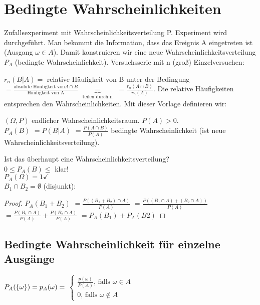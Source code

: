 \renewcommand{\ldate}{2015-11-16}

\section{Bedingte Wahrscheinlichkeiten}
Zufallsexperiment mit Wahrscheinlichkeitsverteilung P. Experiment wird durchgeführt. Man bekommt die Information, dass das Ereignis A eingetreten ist (Ausgang $\omega \in A$). Damit konstruieren wir eine neue Wahrscheinlichkeitsverteilung $P_A$ (bedingte Wahrscheinlichkeit). Versuchsserie mit n (groß) Einzelversuchen:
 
$ r_n(B|A) = $ relative Häufigkeit von B unter der Bedingung 
$= \frac{\textrm{absolute Häufigkeit von} A \cap B}{\textrm{Häufigkeit von A}}$
$\underbrace{=}_{\textrm{teilen durch n}}$
$=\frac{r_n(A\cap B)}{r_n(A)}$.
Die relative Häufigkeiten entsprechen den Wahrscheinlichkeiten. Mit dieser Vorlage definieren wir: 

\begin{defi}
$(\Omega,P)$ endlicher Wahrscheinlichkeitsraum. $P(A) > 0$. \\
$P_A(B) $
$=P(B|A)$  
$=\frac{P(A\cap B)}{P(A)}$
bedingte Wahrscheinlichkeit (ist neue Wahrscheinlichkeitsverteilung). 
\end{defi}

Ist das überhaupt eine Wahrscheinlichkeitsverteilung? \\
$0 \leq P_A(B) \leq$ klar!\\
$P_A(\Omega)=1 \checkmark$\\
$B_1 \cap B_2 = \emptyset$ (disjunkt): 
\begin{proof}
$P_A(B_1 + B_2)$
$=\frac{P((B_1+B_2) \cap A)}{P(A)}$
$=\frac{P((B_1\cap A)+ (B_2\cap A))}{P(A)}$
$=\frac{P(B_1\cap A)}{P(A)} + \frac{P(B_2\cap A)}{P(A)}$
$=P_A(B_1) + P_A(B2)$
\end{proof}

\subsection{Bedingte Wahrscheinlichkeit für einzelne Ausgänge}
$P_A( \left\lbrace \omega \right\rbrace ) = p_A(\omega) = $
$\begin{cases}
\frac{p(\omega)}{P(A)}\textrm{, falls } \omega \in A\\
0\textrm{, falls } \omega \notin A
\end{cases}$


